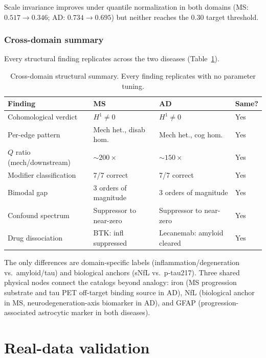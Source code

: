 \documentclass{article}
\begin{document}
Scale invariance improves under quantile normalization in both domains (MS: $0.517 \to 0.346$; AD: $0.734 \to 0.695$) but neither reaches the $0.30$ target threshold.

\subsubsection{Cross-domain summary}

Every structural finding replicates across the two diseases (Table~\ref{tab:cross-summary}).

\begin{table}[t]
\centering
\caption{Cross-domain structural summary. Every finding replicates with no parameter tuning.}
\label{tab:cross-summary}
\small
\begin{tabular}{@{}llll@{}}
\toprule
\textbf{Finding} & \textbf{MS} & \textbf{AD} & \textbf{Same?} \\
\midrule
Cohomological verdict & $H^1 \neq 0$ & $H^1 \neq 0$ & Yes \\
Per-edge pattern & Mech het., disab hom. & Mech het., cog hom. & Yes \\
$Q$ ratio (mech/downstream) & $\sim\!200\times$ & $\sim\!150\times$ & Yes \\
Modifier classification & 7/7 correct & 7/7 correct & Yes \\
Bimodal gap & 3 orders of magnitude & 3 orders of magnitude & Yes \\
Confound spectrum & Suppressor to near-zero & Suppressor to near-zero & Yes \\
Drug dissociation & BTK: infl suppressed & Lecanemab: amyloid cleared & Yes \\
\bottomrule
\end{tabular}
\end{table}

The only differences are domain-specific labels (inflammation/degeneration vs.\ amyloid/tau) and biological anchors (sNfL vs.\ p-tau217).
Three shared physical nodes connect the catalogs beyond analogy: iron (MS progression substrate and tau PET off-target binding source in AD), NfL (biological anchor in MS, neurodegeneration-axis biomarker in AD), and GFAP (progression-associated astrocytic marker in both diseases).

\section{Real-data validation}
\label{sec:realdata}
\end{document}
